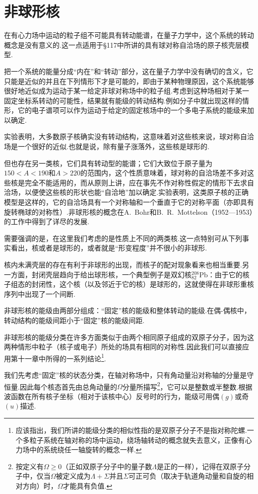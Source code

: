 \section{非球形核}

在有心力场中运动的粒子组不可能具有转动能谱，在量子力学中，这个系统的转动概念是没有意义的.这一点适用于§117中所讲的具有球对称自洽场的原子核壳层模型.

把一个系统的能量分成“内在”和“转动”部分，这在量子力学中没有确切的含义，它只能是近似的并且在下列情形下才是可能的，即由于某种物理原因，这个系统能够很好地近似成为运动于某一给定非球对称场中的粒子组.考虑到这种场相对于某一固定坐标系转动的可能性，结果就有能级的转动结构.例如分子中就出现这样的情形，它的电子谱项可以作为运动于给定的固定核场中的一个多电子系统的能级来加以确定.

实验表明，大多数原子核确实没有转动结构，这意味着对这些核来说，球对称自洽场是一个很好的近似.也就是说，除有量子涨落外，这些核是球形的.

但也存在另一类核，它们具有转动型的能谱；它们大致位于原子量为$150<A<190$和$A>220$的范围内，这个性质意味着，球对称的自洽场差不多对这些核是完全不能适用的，而从原则上讲，应在事先不作对称性假定的情形下去求自洽场，以便使这些核的形状也能“自洽地”加以确定.实验表明，这类原子核的正确模型是这样的，它的自洽场具有一个对称轴和一个垂直于它的对称平面（亦即具有旋转椭球的对称性）.非球形核的概念在A.~Bohr和B.~R.~Mottelson（1952---1953）的工作中得到了详尽的发展.

需要强调的是，在这里我们考虑的是性质上不同的两类核.这一点特别可从下列事实看出，核或者是球形的，或者就是“形变程度”并不很小的非球形.

核内未满壳层的存在有利于非球形的出现，而核子的配对现象看来也相当重要.另一方面，封闭壳层趋向于给出球形核，一个典型例子是双幻核$^{208}_{82}\mathrm{Pb}$：由于它的核子组态的封闭性，这个核（以及邻近于它的核）是球形的，这就使得在非球形重核序列中出现了一个间断.

非球形核的能级由两部分组成：“固定”核的能级和整体转动的能级.在偶-偶核中，转动结构的能级间距小于“固定”核的能级间距.

非球形核的能级分类在许多方面类似于由两个相同原子组成的双原子分子，因为这两种情形中粒子（核子或电子）所处的场具有相同的对称性.因此我们可以直接应用第十一章中所得的一系列结论\footnote{应该指出，我们所讲的能级分类的相似性指的是双原子分子不是指对称陀螺.一个多粒子系统在轴对称的场中运动，绕场轴转动的概念就失去意义，正像有心力场中的系统绕任一轴旋转的概念一样.}.

我们先考虑“固定”核的状态分类，在轴对称场中，只有角动量沿对称轴的分量是守恒量.因此每个核态首先由总角动量的$\Omega$分量所描写\footnote{按定义有$\Omega\geqslant0$（正如双原子分子中的量子数$\Lambda$是正的一样），记得在双原子分子中，仅当$\Omega$被定义成为$\Lambda+\Sigma$并且$\Sigma$可正可负（取决于轨道角动量和自旋的相对方向）时，$\Omega$才能具有负值.}，它可以是整数或半整数.根据波函数在所有核子坐标（相对于该核中心）反号时的行为，能级可用偶$(g)$或奇$(u)$描述.

